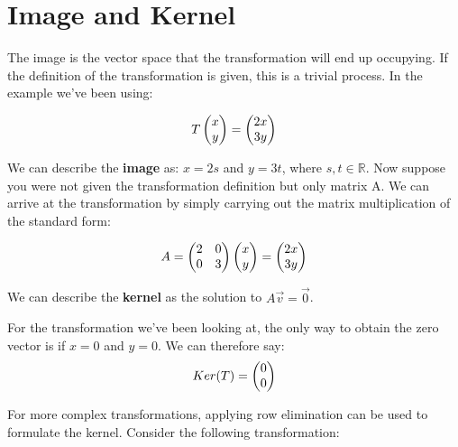 \documentclass{article}
\begin{document}
	
\section{Image and Kernel}
\par \noindent The image is the vector space that the transformation will end up occupying. If the definition of the transformation is given, this is a trivial process. In the example we've been using:

 	\[
 T
 \left(\begin{array}{@{}c@{}}
 	x \\
 	y \\
 \end{array}\right) = 
 \left(\begin{array}{@{}c@{}}
 	2x \\
 	3y \\
 \end{array}\right) 
 \]
	
\par \noindent We can describe the \textbf{image} as: \(x=2s\) and \(y=3t\), where \(s,t \in \mathbb{R}\). Now suppose you were not given the transformation definition but only matrix A. We can arrive at the transformation by simply carrying out the matrix multiplication of the standard form:

		\[A=
\left(\begin{array}{@{}cc@{}}
	2 & 0 \\
	0 & 3 \\
\end{array}\right)
\left(\begin{array}{@{}c@{}}
	x \\
	y \\
\end{array}\right) = 
 \left(\begin{array}{@{}c@{}}
	2x \\
	3y \\
\end{array}\right) 
\]	

\par \noindent We can describe the \textbf{kernel} as the solution to \(A \vec v = \vec 0\). 
\newline
\par \noindent For the transformation we've been looking at, the only way to obtain the zero vector is if \(x=0\) and \(y=0\). We can therefore say:
\[
Ker(T) = 
\left(\begin{array}{@{}c@{}}
	0 \\
	0 \\
\end{array}\right) 
\]
\par \noindent For more complex transformations, applying row elimination can be used to formulate the kernel. Consider the following transformation:
\end{document}
